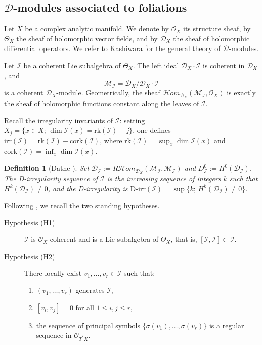 \documentclass[12pt,a4paper]{article}
\newtheorem{definition}[theorem]{Definition}
\begin{document}
\subsection{$\mathcal{D}$-modules associated to foliations}

Let $X$ be a complex analytic manifold. We denote by $\mathcal{O}_X$ its
structure sheaf, by $\Theta_X$ the sheaf of holomorphic vector fields, and
by $\mathcal{D}_X$ the sheaf of holomorphic differential operators. We refer
to Kashiwara \cite{K03} for the general theory of $\mathcal{D}$-modules.

Let $\mathcal{I}$ be a coherent Lie subalgebra of $\Theta_X$. The left ideal
$\mathcal{D}_X \cdot \mathcal{I}$ is coherent in $\mathcal{D}_X$, and
\[
  \mathcal{M}_{\mathcal{I}}
  = \mathcal{D}_X \big/ \mathcal{D}_X \cdot \mathcal{I}
\]
is a coherent $\mathcal{D}_X$-module. Geometrically, the sheaf
$\mathcal{H}om_{\mathcal{D}_X}(\mathcal{M}_{\mathcal{I}}, \mathcal{O}_X)$
is exactly the sheaf of holomorphic functions constant along the leaves of
$\mathcal{I}$.

Recall the irregularity invariants of $\mathcal{I}$: setting
$X_j = \{x \in X;\, \dim \mathcal{I}(x) = \mathrm{rk}(\mathcal{I}) - j\}$,
one defines
$\mathrm{irr}(\mathcal{I}) = \mathrm{rk}(\mathcal{I}) -
\mathrm{cork}(\mathcal{I})$,
where $\mathrm{rk}(\mathcal{I}) = \sup_x \dim\mathcal{I}(x)$ and
$\mathrm{cork}(\mathcal{I}) = \inf_x \dim\mathcal{I}(x)$.

\begin{definition}[Dathe \cite{D16}]\label{def:dirr}
Set $\mathcal{D}_{\mathcal{I}} :=
R\mathcal{H}om_{\mathcal{D}_X}(\mathcal{M}_{\mathcal{I}},
\mathcal{M}_{\mathcal{I}})$ and
$D^0_{\mathcal{I}} := H^0(\mathcal{D}_{\mathcal{I}})$.
The \emph{D-irregularity sequence} of $\mathcal{I}$ is the increasing
sequence of integers $k$ such that
$H^k(\mathcal{D}_{\mathcal{I}}) \neq 0$, and the \emph{D-irregularity} is
$\mathrm{D\text{-}irr}(\mathcal{I})
= \sup\{k;\, H^k(\mathcal{D}_{\mathcal{I}}) \neq 0\}$.
\end{definition}

Following \cite{D16}, we recall the two standing hypotheses.

\begin{description}
\item[Hypothesis (H1)] $\mathcal{I}$ is $\mathcal{O}_X$-coherent and is a
Lie subalgebra of $\Theta_X$, that is,
$[\mathcal{I},\mathcal{I}] \subset \mathcal{I}$.

\item[Hypothesis (H2)] There locally exist $v_1,\ldots,v_r \in \mathcal{I}$
such that:
\begin{enumerate}[label=(\roman*)]
\item $(v_1,\ldots,v_r)$ generates $\mathcal{I}$,
\item $[v_i,v_j] = 0$ for all $1 \leq i,j \leq r$,
\item the sequence of principal symbols
$\{\sigma(v_1),\ldots,\sigma(v_r)\}$ is a regular sequence in
$\mathcal{O}_{T^*X}$.
\end{enumerate}
\end{description}
\end{document}
